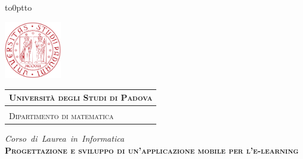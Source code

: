 \begin{titlepage} %
\begin{center}
\vbox to0pt{\vbox to\vss}

\hspace{0.5cm}
\begin{minipage}{.20\textwidth}
  \includegraphics[height=2.5cm]{images/unipd-red}
\end{minipage}\begin{minipage}{.90\textwidth}
  \begin{table}[H]
  \begin{tabular}{l}
  \scshape{\Large{\bfseries{Università degli Studi di Padova}}} \\
  \hline \\
  \scshape{\Large{Dipartimento di matematica}} \\
  \end{tabular}
  \end{table}
\end{minipage}

\emph{\Large{Corso~di~Laurea~in~Informatica}} \\
\vspace{1.5cm}
\scshape{\Large{\bfseries{Progettazione e sviluppo di un'applicazione mobile per l'e-learning}}} \\
\end{center}


\end{titlepage}
